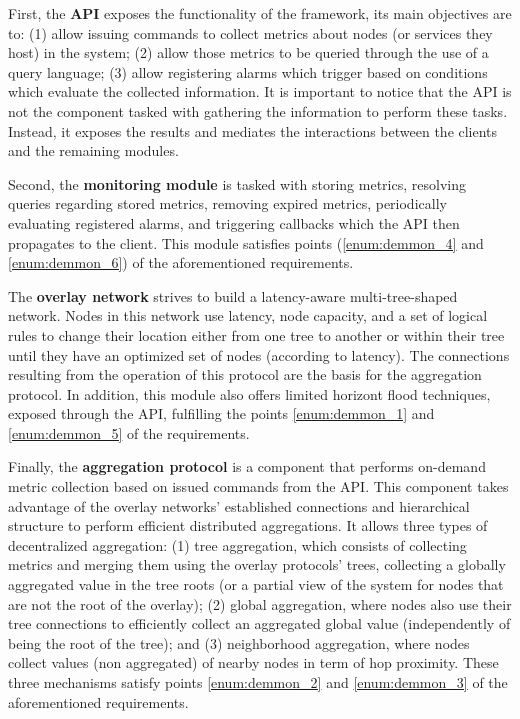 First, the \textbf{API} exposes the functionality of the framework, its main objectives are to: (1) allow issuing commands to collect metrics about nodes (or services they host) in the system; (2) allow those metrics to be queried through the use of a query language; (3) allow registering alarms which trigger based on conditions which evaluate the collected information. It is important to notice that the API is not the component tasked with gathering the information to perform these tasks. Instead, it exposes the results and mediates the interactions between the clients and the remaining modules.

Second, the \textbf{monitoring module} is tasked with storing metrics, resolving queries regarding stored metrics, removing expired metrics, periodically evaluating registered alarms, and triggering callbacks which the API then propagates to the client. This module satisfies points (\ref{enum:demmon_4} and \ref{enum:demmon_6}) of the aforementioned requirements.

The \textbf{overlay network} strives to build a latency-aware multi-tree-shaped network. Nodes in this network use latency, node capacity, and a set of logical rules to change their location either from one tree to another or within their tree until they have an optimized set of nodes (according to latency). The connections resulting from the operation of this protocol are the basis for the aggregation protocol. In addition, this module also offers limited horizont flood techniques, exposed through the API, fulfilling the points \ref{enum:demmon_1} and \ref{enum:demmon_5} of the requirements.

Finally, the \textbf{aggregation protocol} is a component that performs on-demand metric collection based on issued commands from the API. This component takes advantage of the overlay networks' established connections and hierarchical structure to perform efficient distributed aggregations. It allows three types of decentralized aggregation: (1) tree aggregation, which consists of collecting metrics and merging them using the overlay protocols' trees, collecting a globally aggregated value in the tree roots (or a partial view of the system for nodes that are not the root of the overlay); (2) global aggregation, where nodes also use their tree connections to efficiently collect an aggregated global value (independently of being the root of the tree); and (3) neighborhood aggregation, where nodes collect values (non aggregated) of nearby nodes in term of hop proximity. These three mechanisms satisfy points \ref{enum:demmon_2} and \ref{enum:demmon_3} of the aforementioned requirements. 

